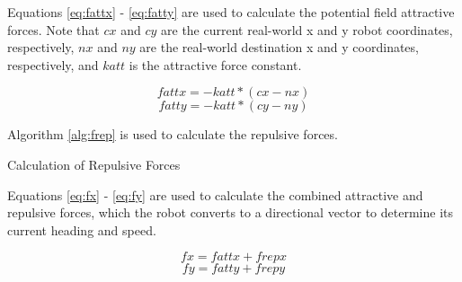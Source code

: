 \documentclass[12pt]{article}
\begin{document}
Equations \ref{eq:fattx} - \ref{eq:fatty} are used to calculate the potential field attractive forces. Note that $cx$ and $cy$ are the current real-world x and y robot coordinates, respectively, $nx$ and $ny$ are the real-world destination x and y coordinates, respectively, and $katt$ is the attractive force constant.

\begin{equation}
fattx = -katt * (cx - nx)
\label{eq:fattx}
\end{equation} 
\begin{equation}
fatty = -katt * (cy - ny)
\label{eq:fatty}
\end{equation} 


Algorithm \ref{alg:frep} is used to calculate the repulsive forces.

\begin{algorithm}[H]
\caption{Calculation of Repulsive Forces}
\label{alg:frep}
\begin{algorithmic}[1]

	\ENDIF
\ENDFOR

\end{algorithmic}
\end{algorithm}


Equations \ref{eq:fx} - \ref{eq:fy} are used to calculate the combined attractive and repulsive forces, which the robot converts to a directional vector to determine its current heading and speed.

\begin{equation}
fx = fattx + frepx
\label{eq:fx}
\end{equation} 
\begin{equation}
fy = fatty + frepy
\label{eq:fy}
\end{equation} 
\end{document}
